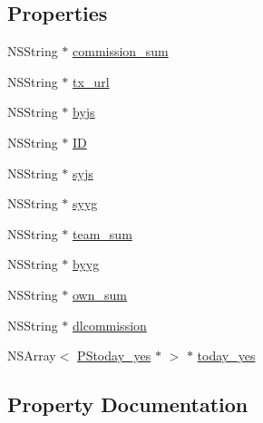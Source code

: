 \subsection*{Properties}
\begin{DoxyCompactItemize}
\item 
N\+S\+String $\ast$ \mbox{\hyperlink{interface_f_n_profit_statistics_model_a7adf78c1b3dc29c5e3b72fc70b2ef1ef}{commission\+\_\+sum}}
\item 
N\+S\+String $\ast$ \mbox{\hyperlink{interface_f_n_profit_statistics_model_a586bcfec69388e19bc4b39fc63ecaf8e}{tx\+\_\+url}}
\item 
N\+S\+String $\ast$ \mbox{\hyperlink{interface_f_n_profit_statistics_model_adf2e1c39864609fc874ae43f579c2cb6}{byjs}}
\item 
N\+S\+String $\ast$ \mbox{\hyperlink{interface_f_n_profit_statistics_model_a5513c24918f97b844bd54b5ce6bfba83}{ID}}
\item 
N\+S\+String $\ast$ \mbox{\hyperlink{interface_f_n_profit_statistics_model_aa06bfeaa32c84de3234bd503aa12383a}{syjs}}
\item 
N\+S\+String $\ast$ \mbox{\hyperlink{interface_f_n_profit_statistics_model_aaef68440ddac7d4f0c5ec2a5bbccb262}{syyg}}
\item 
N\+S\+String $\ast$ \mbox{\hyperlink{interface_f_n_profit_statistics_model_ab81b762b3085160cd07f8740ee5f679c}{team\+\_\+sum}}
\item 
N\+S\+String $\ast$ \mbox{\hyperlink{interface_f_n_profit_statistics_model_a9d76941c8ab2b5acdc1f5138e131aa3b}{byyg}}
\item 
N\+S\+String $\ast$ \mbox{\hyperlink{interface_f_n_profit_statistics_model_ad645b09d1d3ad7b233fb7530e6744e12}{own\+\_\+sum}}
\item 
N\+S\+String $\ast$ \mbox{\hyperlink{interface_f_n_profit_statistics_model_ab39bfaeabb48701c3ecfac40a9648230}{dlcommission}}
\item 
N\+S\+Array$<$ \mbox{\hyperlink{interface_p_stoday__yes}{P\+Stoday\+\_\+yes}} $\ast$ $>$ $\ast$ \mbox{\hyperlink{interface_f_n_profit_statistics_model_adfcb5789525b24c0caada394734d31a6}{today\+\_\+yes}}
\end{DoxyCompactItemize}


\subsection{Property Documentation}
\mbox{\label{interface_f_n_profit_statistics_model_adf2e1c39864609fc874ae43f579c2cb6}} 
